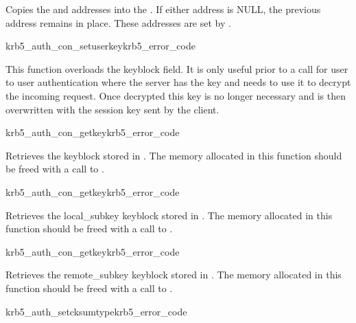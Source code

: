 Copies the  and  addresses
into the . If either address is NULL, the previous
address remains in place. These addresses are set by
. 

\begin{funcdecl}{krb5_auth_con_setuserkey}{krb5_error_code}{\funcinout}
\funcin
{}
\end{funcdecl}

This function overloads the keyblock field. It is only useful prior to a
 call for user to user authentication where
the server has the key and needs to use it to decrypt the incoming
request.  Once decrypted this key is no longer necessary and is then
overwritten with the session key sent by the client. 

\begin{funcdecl}{krb5_auth_con_getkey}{krb5_error_code}{\funcinout}
\funcout
{}
\end{funcdecl}

Retrieves the keyblock stored in . The memory
allocated in this function should be freed with a call to
. 

\begin{funcdecl}{krb5_auth_con_getkey}{krb5_error_code}{\funcinout}
\funcout
{}
\end{funcdecl}

Retrieves the local_subkey keyblock stored in
. The memory allocated in this function should
be freed with a call to .

\begin{funcdecl}{krb5_auth_con_getkey}{krb5_error_code}{\funcinout}
\funcout
{}
\end{funcdecl}

Retrieves the remote_subkey keyblock stored in
. The memory allocated in this function should
be freed with a call to .


\begin{funcdecl}{krb5_auth_setcksumtype}{krb5_error_code}{\funcinout}
\funcin
{}
\end{funcdecl}


